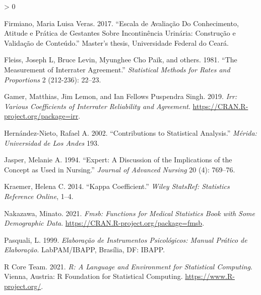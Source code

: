 \documentclass[
]{article}
\newlength{\cslhangindent}
\newenvironment{CSLReferences}[2] %
 {%
  \setlength{\parindent}{0pt}
  \ifodd #1 \everypar{\setlength{\hangindent}{\cslhangindent}}\ignorespaces\fi
  \ifnum #2 > 0
  \setlength{\parskip}{#2\baselineskip}
  \fi
 }%
 {}
\begin{document}
\hypertarget{refs}{}
\begin{CSLReferences}{1}{0}
\leavevmode\hypertarget{ref-firmiano2017escala}{}%
Firmiano, Maria Luisa Veras. 2017. {``Escala de Avaliação Do Conhecimento, Atitude e Prática de Gestantes Sobre Incontinência Urinária: Construção e Validação de Conteúdo.''} Master's thesis, Universidade Federal do Ceará.

\leavevmode\hypertarget{ref-fleiss1981measurement}{}%
Fleiss, Joseph L, Bruce Levin, Myunghee Cho Paik, and others. 1981. {``The Measurement of Interrater Agreement.''} \emph{Statistical Methods for Rates and Proportions} 2 (212-236): 22--23.

\leavevmode\hypertarget{ref-irr2019package}{}%
Gamer, Matthias, Jim Lemon, and Ian Fellows Puspendra Singh. 2019. \emph{Irr: Various Coefficients of Interrater Reliability and Agreement}. \url{https://CRAN.R-project.org/package=irr}.

\leavevmode\hypertarget{ref-hernandez2002contributions}{}%
Hernández-Nieto, Rafael A. 2002. {``Contributions to Statistical Analysis.''} \emph{M{é}rida: Universidad de Los Andes} 193.

\leavevmode\hypertarget{ref-jasper1994expert}{}%
Jasper, Melanie A. 1994. {``Expert: A Discussion of the Implications of the Concept as Used in Nursing.''} \emph{Journal of Advanced Nursing} 20 (4): 769--76.

\leavevmode\hypertarget{ref-kraemer2014kappa}{}%
Kraemer, Helena C. 2014. {``Kappa Coefficient.''} \emph{Wiley StatsRef: Statistics Reference Online}, 1--4.

\leavevmode\hypertarget{ref-fmsb2021package}{}%
Nakazawa, Minato. 2021. \emph{Fmsb: Functions for Medical Statistics Book with Some Demographic Data}. \url{https://CRAN.R-project.org/package=fmsb}.

\leavevmode\hypertarget{ref-pasquali1999elaboraccao}{}%
Pasquali, L. 1999. \emph{Elaboração de Instrumentos Psicológicos: Manual Prático de Elaboração}. LabPAM/IBAPP, Brasília, DF: IBAPP.

\leavevmode\hypertarget{ref-Rlang}{}%
R Core Team. 2021. \emph{R: A Language and Environment for Statistical Computing}. Vienna, Austria: R Foundation for Statistical Computing. \url{https://www.R-project.org/}.

\end{CSLReferences}
\end{document}
